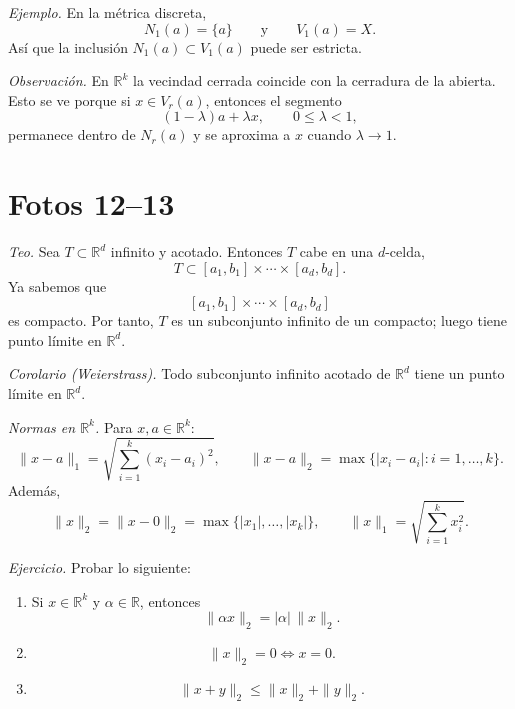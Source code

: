 \documentclass[12pt]{article}
\begin{document}
\textit{Ejemplo.} En la métrica discreta,
\[
N_1(a)=\{a\}\qquad\text{y}\qquad V_1(a)=X.
\]
Así que la inclusión $N_1(a)\subset V_1(a)$ puede ser estricta.

\textit{Observación.} En $\mathbb R^k$ la vecindad cerrada coincide con la cerradura de la abierta.
Esto se ve porque si $x\in V_r(a)$, entonces el segmento
\[
(1-\lambda)a+\lambda x,\qquad 0\le \lambda<1,
\]
permanece dentro de $N_r(a)$ y se aproxima a $x$ cuando $\lambda\to 1$.

\section*{Fotos 12--13}

\textit{Teo.} Sea $T\subset\mathbb R^d$ infinito y acotado.
Entonces $T$ cabe en una $d$-celda,
\[
T\subset [a_1,b_1]\times\cdots\times[a_d,b_d].
\]
Ya sabemos que
\[
[a_1,b_1]\times\cdots\times[a_d,b_d]
\]
es compacto.
Por tanto, $T$ es un subconjunto infinito de un compacto; luego tiene punto límite en $\mathbb R^d$.

\textit{Corolario (Weierstrass).} Todo subconjunto infinito acotado de $\mathbb R^d$ tiene un punto límite en $\mathbb R^d$.

\textit{Normas en $\mathbb R^k$.} Para $x,a\in\mathbb R^k$:
\[
\|x-a\|_1=\sqrt{\sum_{i=1}^k(x_i-a_i)^2},
\qquad
\|x-a\|_2=\max\{|x_i-a_i|:i=1,\dots,k\}.
\]
Además,
\[
\|x\|_2=\|x-0\|_2=\max\{|x_1|,\dots,|x_k|\},
\qquad
\|x\|_1=\sqrt{\sum_{i=1}^k x_i^2}.
\]

\textit{Ejercicio.} Probar lo siguiente:
\begin{enumerate}[label=\roman*)]
    \item Si $x\in\mathbb R^k$ y $\alpha\in\mathbb R$, entonces
    \[
    \|\alpha x\|_2=|\alpha|\,\|x\|_2.
    \]
    \item
    \[
    \|x\|_2=0 \iff x=0.
    \]
    \item
    \[
    \|x+y\|_2\le \|x\|_2+\|y\|_2.
    \]
\end{enumerate}
\end{document}
